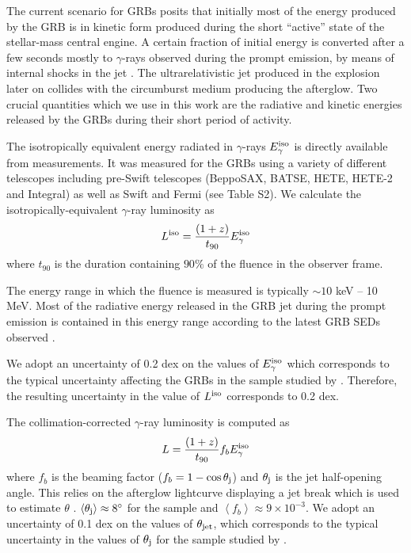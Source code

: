 \documentclass[12pt]{article}
\begin{document}
The current scenario for GRBs \cite{smeszaros02,snakar10} posits that initially most of the energy produced by the GRB is in kinetic form produced during the short ``active'' state of the stellar-mass central engine. A certain fraction of initial energy is converted after a few seconds mostly to $\gamma$-rays observed during the prompt emission, by means of internal shocks in the jet \cite{spiran99}. The ultrarelativistic jet produced in the explosion later on collides with the circumburst medium producing the afterglow. Two crucial quantities which we use in this work are the radiative and kinetic energies released by the GRBs during their short period of activity.

The isotropically equivalent energy radiated in $\gamma$-rays $E_\gamma^{\rm iso}$ is directly available from measurements. It was measured for the GRBs using a variety of different telescopes including pre-Swift telescopes (BeppoSAX, BATSE, HETE, HETE-2 and Integral) as well as Swift and Fermi (see Table S2).
We calculate the isotropically-equivalent $\gamma$-ray luminosity as
\begin{equation}
L^{\rm iso} = \frac{(1+z)}{t_{90}} E_\gamma^{\rm iso}
\end{equation}
where $t_{90}$ is the duration containing $90\%$ of the fluence in the observer frame.

The energy range in which the fluence is measured is typically $\sim 10$ keV -- 10 MeV. Most of the radiative energy released in the GRB jet during the prompt emission is contained in this energy range according to the latest GRB SEDs observed \cite{sacker11}. 

We adopt an uncertainty of 0.2 dex on the values of $E_\gamma^{\rm iso}$ which corresponds to the typical uncertainty affecting the GRBs in the sample studied by \cite{slz04}. Therefore, the resulting uncertainty in the value of $L^{\rm iso}$ corresponds to 0.2 dex.

The collimation-corrected $\gamma$-ray luminosity is computed as
\begin{equation}
L = \frac{(1+z)}{t_{90}} f_b E_\gamma^{\rm iso}
\end{equation}
where $f_b$ is the beaming factor ($f_b = 1-\cos \theta_{\rm j}$) and $\theta_{\rm j}$ is the jet half-opening angle. This relies on the afterglow lightcurve displaying a jet break which is used to estimate $\theta$ \cite{sfrail01}. $\left \langle \theta_{\rm j} \right \rangle \approx 8^\circ$ for the sample and $\left \langle f_b \right \rangle \approx 9 \times 10^{-3}$. 
We adopt an uncertainty of 0.1 dex on the values of $\theta_{\rm jet}$, which corresponds to the typical uncertainty in the values of $\theta_{\rm j}$ for the sample studied by \cite{slz04}.
\end{document}
